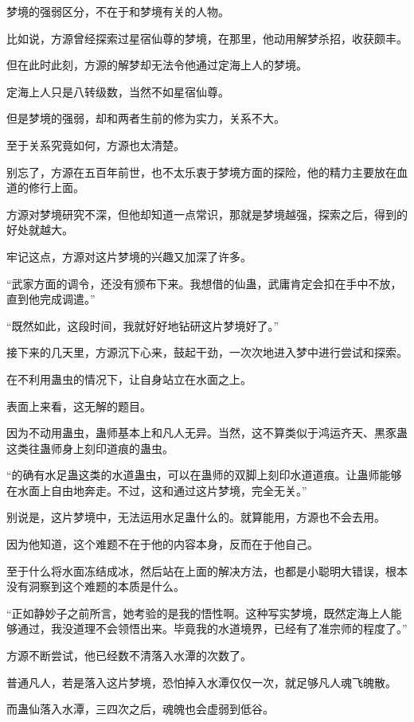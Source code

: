 \begin{this_body}
梦境的强弱区分，不在于和梦境有关的人物。

比如说，方源曾经探索过星宿仙尊的梦境，在那里，他动用解梦杀招，收获颇丰。

但在此时此刻，方源的解梦却无法令他通过定海上人的梦境。

定海上人只是八转级数，当然不如星宿仙尊。

但是梦境的强弱，却和两者生前的修为实力，关系不大。

至于关系究竟如何，方源也太清楚。

别忘了，方源在五百年前世，也不太乐衷于梦境方面的探险，他的精力主要放在血道的修行上面。

方源对梦境研究不深，但他却知道一点常识，那就是梦境越强，探索之后，得到的好处就越大。

牢记这点，方源对这片梦境的兴趣又加深了许多。

“武家方面的调令，还没有颁布下来。我想借的仙蛊，武庸肯定会扣在手中不放，直到他完成调遣。”

“既然如此，这段时间，我就好好地钻研这片梦境好了。”

接下来的几天里，方源沉下心来，鼓起干劲，一次次地进入梦中进行尝试和探索。

在不利用蛊虫的情况下，让自身站立在水面之上。

表面上来看，这无解的题目。

因为不动用蛊虫，蛊师基本上和凡人无异。当然，这不算类似于鸿运齐天、黒豕蛊这类往蛊师身上刻印道痕的蛊虫。

“的确有水足蛊这类的水道蛊虫，可以在蛊师的双脚上刻印水道道痕。让蛊师能够在水面上自由地奔走。不过，这和通过这片梦境，完全无关。”

别说是，这片梦境中，无法运用水足蛊什么的。就算能用，方源也不会去用。

因为他知道，这个难题不在于他的内容本身，反而在于他自己。

至于什么将水面冻结成冰，然后站在上面的解决方法，也都是小聪明大错误，根本没有洞察到这个难题的本质是什么。

“正如静妙子之前所言，她考验的是我的悟性啊。这种写实梦境，既然定海上人能够通过，我没道理不会领悟出来。毕竟我的水道境界，已经有了准宗师的程度了。”

方源不断尝试，他已经数不清落入水潭的次数了。

普通凡人，若是落入这片梦境，恐怕掉入水潭仅仅一次，就足够凡人魂飞魄散。

而蛊仙落入水潭，三四次之后，魂魄也会虚弱到低谷。


\end{this_body}
